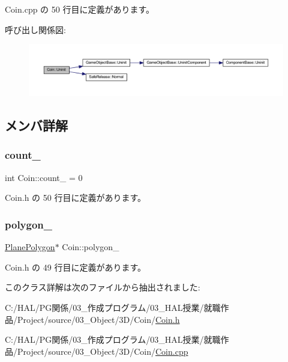  Coin.\+cpp の 50 行目に定義があります。

呼び出し関係図\+:\nopagebreak
\begin{figure}[H]
\begin{center}
\leavevmode
\includegraphics[width=350pt]{class_coin_a4d364dcb4b57b80ea00ce931d0bb300f_cgraph}
\end{center}
\end{figure}


\subsection{メンバ詳解}
\mbox{\label{class_coin_aae793812faef50ec76f8293676150a9a}} 
\subsubsection{\texorpdfstring{count\+\_\+}{count\_}}
{\footnotesize\ttfamily int Coin\+::count\+\_\+ = 0\hspace{0.3cm}{\ttfamily [private]}}



 Coin.\+h の 50 行目に定義があります。

\mbox{\label{class_coin_a30f920359d7dd4fa7b44f5135890c377}} 
\subsubsection{\texorpdfstring{polygon\+\_\+}{polygon\_}}
{\footnotesize\ttfamily \mbox{\hyperlink{class_plane_polygon}{Plane\+Polygon}}$\ast$ Coin\+::polygon\+\_\+\hspace{0.3cm}{\ttfamily [private]}}



 Coin.\+h の 49 行目に定義があります。



このクラス詳解は次のファイルから抽出されました\+:\begin{DoxyCompactItemize}
\item 
C\+:/\+H\+A\+L/\+P\+G関係/03\+\_\+作成プログラム/03\+\_\+\+H\+A\+L授業/就職作品/\+Project/source/03\+\_\+\+Object/3\+D/\+Coin/\mbox{\hyperlink{_coin_8h}{Coin.\+h}}\item 
C\+:/\+H\+A\+L/\+P\+G関係/03\+\_\+作成プログラム/03\+\_\+\+H\+A\+L授業/就職作品/\+Project/source/03\+\_\+\+Object/3\+D/\+Coin/\mbox{\hyperlink{_coin_8cpp}{Coin.\+cpp}}\end{DoxyCompactItemize}
